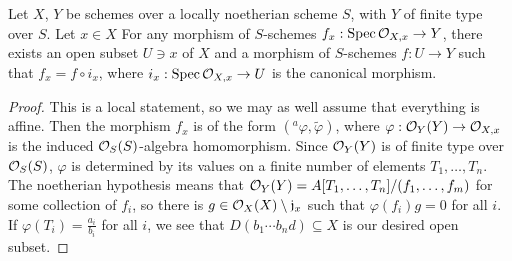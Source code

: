 \begin{exer}
	Let $X$, $Y$ be schemes over a locally noetherian scheme $S$, with $Y$
	of finite type over $S$. Let $x \in X$ For any morphism of $S$-schemes
	$f_x: \operatorname{Spec} \mathcal{O}_{X,x} \to Y$, there exists an open subset $U \ni x$ of
	$X$ and a morphism of $S$-schemes $f: U \to Y$ such that $f_x = f \circ
	i_x$, where $i_x: \operatorname{Spec} \mathcal{O}_{X,x} \to U$ is the canonical morphism.
\end{exer}
\begin{proof}
	This is a local statement, so we may as well assume that everything is
	affine. Then the morphism $f_x$ is of the form $({}^a\varphi,
	\tilde{\varphi})$, where $\varphi: \mathcal{O}_Y(Y) \to \mathcal{O}_{X,x}$ is the
	induced $\mathcal{O}_S(S)$-algebra homomorphism. Since $\mathcal{O}_Y(Y)$ is of finite
	type over $\mathcal{O}_S(S)$, $\varphi$ is determined by its values on a finite
	number of elements $T_1, \ldots, T_n$. The noetherian
	hypothesis means that $\mathcal{O}_Y(Y) = A[T_1, \ldots, T_n]/(f_1,\ldots,f_m)$
	for some collection of $f_i$, so there is $g \in \mathcal{O}_X(X) \setminus
	\mathfrak{j}_x$ such that $\varphi(f_i)g = 0$ for all $i$. If $\varphi(T_i) =
	\frac{a_i}{b_i}$ for all $i$, we see that $D(b_1\cdots b_nd) \subseteq
	X$ is our desired open subset.
\end{proof}

